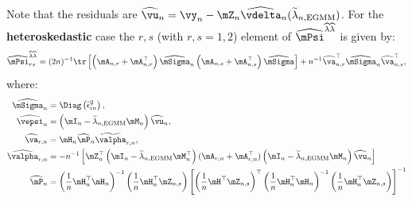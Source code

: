 \documentclass[english,12pt]{book}\usepackage[]{graphicx}\usepackage[]{xcolor}
\begin{document}
Note that the residuals are $\widehat{\vu}_n = \vy_n-\mZ_n\widehat{\vdelta}_n(\widetilde{\lambda}_{n, \textrm{EGMM}})$. For the \textbf{heteroskedastic} case the $r, s$ (with $r,s = 1,2$) element of $\widehat{\mPsi}^{\widehat{\lambda}\widehat{\lambda}}$ is given by:
\begin{equation}\label{eq:Psi-second-step}
  \widehat{\mPsi}^{\widehat{\lambda}\widehat{\lambda}}_{rs} = (2n)^{-1}\tr\left[\left(\mA_{n,r} + \mA_{n, r}^\top\right)\widehat{\mSigma}_n\left(\mA_{n, s} + \mA_{n, s}^\top\right)\widehat{\mSigma}\right]  + n^{-1}\widehat{\va}_{n, r}^\top\widehat{\mSigma}_n\widehat{\va}_{n, s}^\top,
\end{equation}
%
where:
\begin{equation*}
  \begin{aligned}
    \widehat{\mSigma}_n  & = \Diag\left(\widetilde{\epsilon}_{in}^2\right), \\
    \widehat{\vepsi}_n   & = \left(\mI_n - \widetilde{\lambda}_{n, \textrm{EGMM}}\mM_n\right)\widehat{\vu}_n, \\
    \widehat{\va}_{r,n} & = \mH_n\widehat{\mP}_n\widetilde{\valpha}_{r,n},  \\
    \widehat{\valpha}_{r,n} & = - n^{-1}\left[\mZ^\top_n\left(\mI_n - \widetilde{\lambda}_{n, \textrm{EGMM}}\mM_n^\top\right)(\mA_{r, n} + \mA_{r, n}^\top)\left(\mI_n - \widetilde{\lambda}_{n, \textrm{EGMM}}\mM_n\right)\widehat{\vu}_n\right] \\
    \widehat{\mP}_n & = \left(\frac{1}{n}\mH^\top_n\mH_n\right)^{-1}\left(\frac{1}{n}\mH_n^\top\mZ_{n, s} \right)\left[\left(\frac{1}{n}\mH^\top\mZ_{n, s}\right)^\top\left(\frac{1}{n}\mH^\top_n\mH_n\right)^{-1}\left(\frac{1}{n}\mH^\top_n\mZ_{n, s}\right)\right]^{-1}
  \end{aligned}
\end{equation*}
\end{document}
